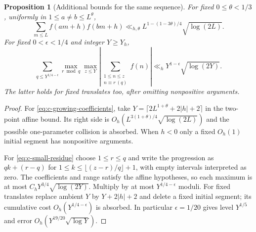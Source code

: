 \documentclass[11pt]{article}
\newtheorem{proposition}[theorem]{Proposition}
\theoremstyle{definition}
\theoremstyle{remark}
\numberwithin{equation}{section}
\begin{document}
\begin{proposition}[Additional bounds for the same sequence]\label{prop:c-extra}
For fixed $0\le\theta<1/3$, uniformly in $1\le a\ne b\le L^\theta$,
\begin{equation}\label{eq:c-growing-coefficients}
 \sum_{m\le L}f(am+h)f(bm+h)
 \ll_{h,\theta}L^{1-(1-3\theta)/4}\sqrt{\log(2L)}.
\end{equation}
For fixed $0<\epsilon<1/4$ and integer $Y\ge Y_h$,
\begin{equation}\label{eq:c-small-residue}
 \sum_{q\le Y^{1/4-\epsilon}}\max_{r\bmod q}\max_{z\le Y}
 \left|\sum_{\substack{1\le n\le z\\n\equiv r\ (q)}}f(n)\right|
 \ll_h Y^{1-\epsilon}\sqrt{\log(2Y)}.
\end{equation}
The latter holds for fixed translates too, after omitting nonpositive arguments.
\end{proposition}
\begin{proof}
For \eqref{eq:c-growing-coefficients}, take
$Y=\lceil2L^{1+\theta}+2|h|+2\rceil$ in the two-point affine bound. Its right side is
$O_h(L^{3(1+\theta)/4}\sqrt{\log(2L)})$ and the possible one-parameter collision is absorbed.
When $h<0$ only a fixed $O_h(1)$ initial segment has nonpositive arguments.

For \eqref{eq:c-small-residue} choose $1\le r\le q$ and write the progression as
$qk+(r-q)$ for $1\le k\le\lfloor(z-r)/q\rfloor+1$, with empty intervals interpreted as zero.
The coefficients and range satisfy the affine hypotheses, so each maximum is at most
$C_hY^{3/4}\sqrt{\log(2Y)}$. Multiply by at most $Y^{1/4-\epsilon}$ moduli.
For fixed translates replace ambient $Y$ by $Y+2|h|+2$ and delete a fixed initial segment;
its cumulative cost $O_h(Y^{1/4-\epsilon})$ is absorbed.
In particular $\epsilon=1/20$ gives level $Y^{1/5}$ and error
$O_h(Y^{19/20}\sqrt{\log Y})$.
\end{proof}
\end{document}

